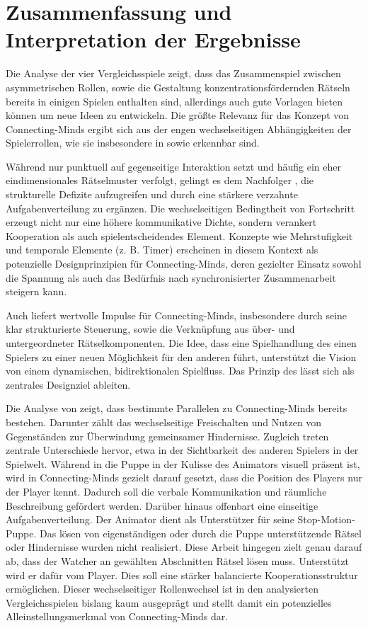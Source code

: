 \section{Zusammenfassung und Interpretation der Ergebnisse}
Die Analyse der vier Vergleichsspiele zeigt, dass das Zusammenspiel zwischen asymmetrischen Rollen, sowie die Gestaltung konzentrationsfördernden Rätseln  bereits in einigen Spielen enthalten sind, allerdings auch gute Vorlagen bieten können um neue Ideen zu entwickeln.
Die größte Relevanz für das Konzept von Connecting-Minds ergibt sich aus der engen wechselseitigen Abhängigkeiten der Spielerrollen, wie sie insbesondere in  sowie  erkennbar sind.

Während  nur punktuell auf gegenseitige Interaktion setzt und häufig ein eher eindimensionales Rätselmuster verfolgt, gelingt es dem Nachfolger , die strukturelle Defizite aufzugreifen und durch eine stärkere verzahnte Aufgabenverteilung zu ergänzen. Die wechselseitigen Bedingtheit von Fortschritt erzeugt nicht nur eine höhere kommunikative Dichte, sondern verankert Kooperation als auch spielentscheidendes Element. Konzepte wie Mehrstufigkeit und temporale Elemente (z. B. Timer) erscheinen in diesem Kontext als potenzielle Designprinzipien für Connecting-Minds, deren gezielter Einsatz sowohl die Spannung als auch das Bedürfnis nach synchronisierter Zusammenarbeit steigern kann.

Auch  liefert wertvolle Impulse für Connecting-Minds, insbesondere durch seine klar strukturierte Steuerung, sowie die Verknüpfung aus über- und untergeordneter Rätselkomponenten. Die Idee, dass eine Spielhandlung des einen Spielers zu einer neuen Möglichkeit für den anderen führt, unterstützt die Vision von einem dynamischen, bidirektionalen Spielfluss. Das Prinzip des  lässt sich als zentrales Designziel ableiten.

Die Analyse von  zeigt, dass bestimmte Parallelen zu Connecting-Minds bereits bestehen. Darunter zählt das wechselseitige Freischalten und Nutzen von Gegenständen zur Überwindung gemeinsamer Hindernisse. Zugleich treten zentrale Unterschiede hervor, etwa in der Sichtbarkeit des anderen Spielers in der Spielwelt. Während in  die Puppe in der Kulisse des Animators visuell präsent ist, wird in Connecting-Minds gezielt darauf gesetzt, dass die Position des Players nur der Player kennt. Dadurch soll die verbale Kommunikation und räumliche Beschreibung gefördert werden.
Darüber hinaus offenbart  eine einseitige Aufgabenverteilung. Der Animator dient als Unterstützer für seine Stop-Motion-Puppe. Das lösen von eigenständigen oder durch die Puppe unterstützende Rätsel oder Hindernisse wurden nicht realisiert. Diese Arbeit hingegen zielt genau darauf ab, dass der Watcher an gewählten Abschnitten Rätsel lösen muss. Unterstützt wird er dafür vom Player. Dies soll eine stärker balancierte Kooperationsstruktur ermöglichen. Dieser wechselseitiger Rollenwechsel ist in den analysierten Vergleichsspielen bislang kaum ausgeprägt und stellt damit ein potenzielles Alleinstellungsmerkmal von Connecting-Minds dar.

